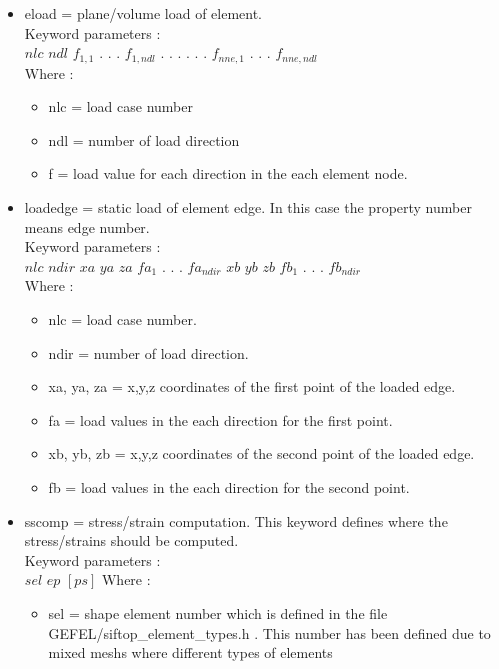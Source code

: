 \documentclass[12pt]{book}
\begin{document}
\begin{itemize}
\item eload =  plane/volume load of element.\\
         Keyword parameters :\\
         $nlc$ $ndl$ $f_{1,1}$ . . . $f_{1,ndl}$ . . . . . . $f_{nne,1}$ . . . $f_{nne,ndl}$\\
         Where :
         \begin{itemize}
         \item nlc = load case number
         \item ndl = number of load direction
         \item f   = load value for each direction in the each element node.
         \end{itemize}
\item loadedge = static load of element edge. In this case the property number
           means edge number.\\
           Keyword parameters :\\
           $nlc$ $ndir$ $xa$ $ya$ $za$ $fa_1$ . . . $fa_{ndir}$ $xb$ $yb$ $zb$ $fb_1$ . . . $fb_{ndir}$\\
           Where :
           \begin{itemize}
           \item nlc = load case number.
           \item ndir = number of load direction.
           \item xa, ya, za = x,y,z coordinates of the first point of the loaded edge.
           \item fa  = load values in the each direction for the first point.
           \item xb, yb, zb = x,y,z coordinates of the second point of the loaded
                        edge.
           \item fb  = load values in the each direction for the second point.
           \end{itemize}
\item sscomp = stress/strain computation. This keyword defines where the stress/strains
         should be computed.\\
         Keyword parameters :\\
         $sel$ $ep$ $[ps]$
         Where :
         \begin{itemize}
         \item sel = shape element number which is defined in the file
               GEFEL/siftop\_element\_types.h . This number has been defined
               due to mixed meshs where different types of elements

\end{itemize}
\end{itemize}
\end{document}
